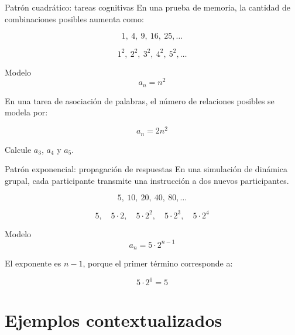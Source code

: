 \documentclass[handout,aspectratio=169]{beamer}
\begin{document}
	
	\begin{frame}{Patrón cuadrático: tareas cognitivas}
		En una prueba de memoria, la cantidad de combinaciones posibles aumenta como:
		
		\[
		1,\ 4,\ 9,\ 16,\ 25,\ldots
		\]
		
		\pause
		
		\[
		1^2,\ 2^2,\ 3^2,\ 4^2,\ 5^2,\ldots
		\]
		
		\pause
		
		\begin{block}{Modelo}
			\[
			a_n=n^2
			\]
		\end{block}
		
		\pause
		
		\begin{actividad}
			En una tarea de asociación de palabras, el número de relaciones posibles se modela por:
			
			\[
			a_n=2n^2
			\]
			
			Calcule \(a_3\), \(a_4\) y \(a_5\).
		\end{actividad}
	\end{frame}
	
	
	\begin{frame}{Patrón exponencial: propagación de respuestas}
		En una simulación de dinámica grupal, cada participante transmite una instrucción a dos nuevos participantes.
		
		\[
		5,\ 10,\ 20,\ 40,\ 80,\ldots
		\]
		
		\pause
		
		\[
		5,\quad 5\cdot2,\quad 5\cdot2^2,\quad 5\cdot2^3,\quad 5\cdot2^4
		\]
		
		\pause
		
		\begin{block}{Modelo}
			\[
			a_n=5\cdot2^{n-1}
			\]
		\end{block}
		
		\pause
		
		\begin{alerta}
			El exponente es \(n-1\), porque el primer término corresponde a:
			
			\[
			5\cdot2^0=5
			\]
		\end{alerta}
	\end{frame}
	
	\section{Ejemplos contextualizados}
	
\end{document}
